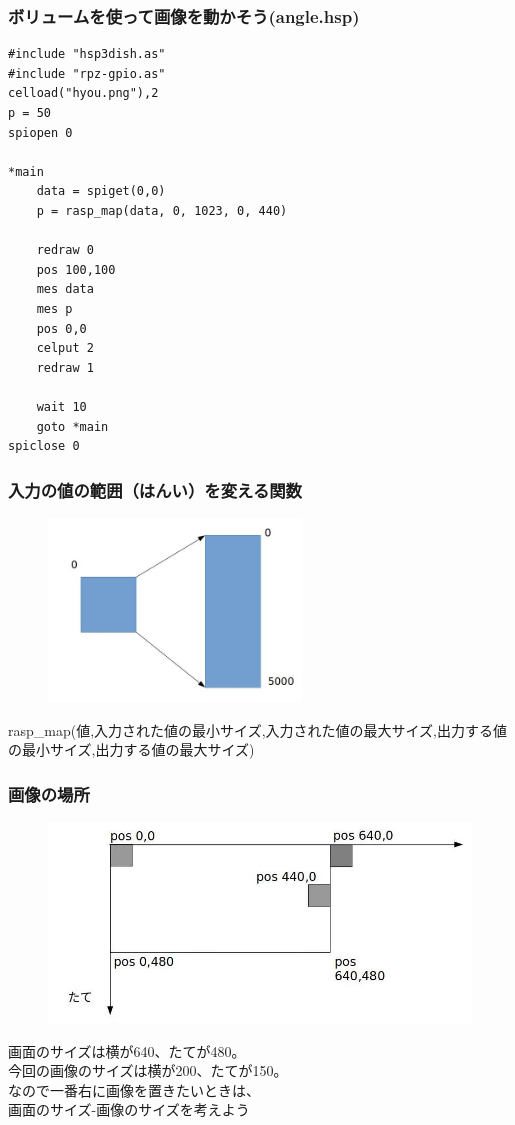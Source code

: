\begin{frame}[fragile]
    \frametitle{ボリュームを使って画像を動かそう(angle.hsp)}
\begin{lstlisting}
#include "hsp3dish.as"
#include "rpz-gpio.as"
celload("hyou.png"),2
p = 50
spiopen 0

*main
	data = spiget(0,0)
	p = rasp_map(data, 0, 1023, 0, 440)

	redraw 0
	pos 100,100
	mes data
	mes p
	pos 0,0
	celput 2
	redraw 1

	wait 10	
	goto *main
spiclose 0
\end{lstlisting}
\end{frame}

\begin{frame}[fragile]
    \frametitle{入力の値の範囲（はんい）を変える関数}
    \begin{center}
        \begin{figure}
            \includegraphics[width=0.6\textwidth]{images/slide/rasp_map.jpg}
        \end{figure}
        {rasp\_map(値,入力された値の最小サイズ,入力された値の最大サイズ,出力する値の最小サイズ,出力する値の最大サイズ)}
    \end{center}
\end{frame}

\begin{frame}[fragile]
    \frametitle{画像の場所}
    \begin{center}
        \begin{figure}
            \includegraphics[width=\textwidth]{images/slide/volume_position.jpg}
        \end{figure}
        {画面のサイズは横が640、たてが480。\\
        今回の画像のサイズは横が200、たてが150。\\
        なので一番右に画像を置きたいときは、\\
        画面のサイズ-画像のサイズを考えよう}
    \end{center}
\end{frame}

